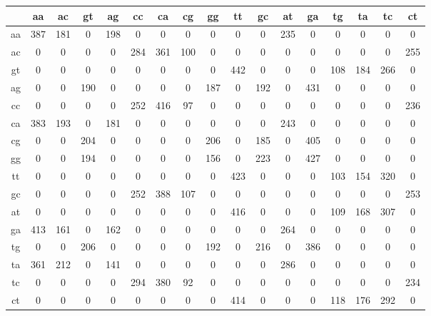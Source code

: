 \documentclass{homework}
\begin{document}
\begin{enumerate}
\begin{enumerate}
\begin{tabular}{c|cccccccccccccccc}
   & aa & ac & gt & ag & cc & ca & cg & gg & tt & gc & at & ga & tg & ta & tc & ct\\\hline
aa & 387 & 181 &   0 & 198 &   0 &   0 &   0 &   0 &   0 &   0 & 235 &   0 &   0 &   0 &   0 &   0\\
ac &   0 &   0 &   0 &   0 & 284 & 361 & 100 &   0 &   0 &   0 &   0 &   0 &   0 &   0 &   0 & 255\\
gt &   0 &   0 &   0 &   0 &   0 &   0 &   0 &   0 & 442 &   0 &   0 &   0 & 108 & 184 & 266 &   0\\
ag &   0 &   0 & 190 &   0 &   0 &   0 &   0 & 187 &   0 & 192 &   0 & 431 &   0 &   0 &   0 &   0\\
cc &   0 &   0 &   0 &   0 & 252 & 416 &  97 &   0 &   0 &   0 &   0 &   0 &   0 &   0 &   0 & 236\\
ca & 383 & 193 &   0 & 181 &   0 &   0 &   0 &   0 &   0 &   0 & 243 &   0 &   0 &   0 &   0 &   0\\
cg &   0 &   0 & 204 &   0 &   0 &   0 &   0 & 206 &   0 & 185 &   0 & 405 &   0 &   0 &   0 &   0\\
gg &   0 &   0 & 194 &   0 &   0 &   0 &   0 & 156 &   0 & 223 &   0 & 427 &   0 &   0 &   0 &   0\\
tt &   0 &   0 &   0 &   0 &   0 &   0 &   0 &   0 & 423 &   0 &   0 &   0 & 103 & 154 & 320 &   0\\
gc &   0 &   0 &   0 &   0 & 252 & 388 & 107 &   0 &   0 &   0 &   0 &   0 &   0 &   0 &   0 & 253\\
at &   0 &   0 &   0 &   0 &   0 &   0 &   0 &   0 & 416 &   0 &   0 &   0 & 109 & 168 & 307 &   0\\
ga & 413 & 161 &   0 & 162 &   0 &   0 &   0 &   0 &   0 &   0 & 264 &   0 &   0 &   0 &   0 &   0\\
tg &   0 &   0 & 206 &   0 &   0 &   0 &   0 & 192 &   0 & 216 &   0 & 386 &   0 &   0 &   0 &   0\\
ta & 361 & 212 &   0 & 141 &   0 &   0 &   0 &   0 &   0 &   0 & 286 &   0 &   0 &   0 &   0 &   0\\
tc &   0 &   0 &   0 &   0 & 294 & 380 &  92 &   0 &   0 &   0 &   0 &   0 &   0 &   0 &   0 & 234\\
ct &   0 &   0 &   0 &   0 &   0 &   0 &   0 &   0 & 414 &   0 &   0 &   0 & 118 & 176 & 292 &   0\\
\end{tabular}

\normalsize


\end{enumerate}
\end{enumerate}
\end{document}

